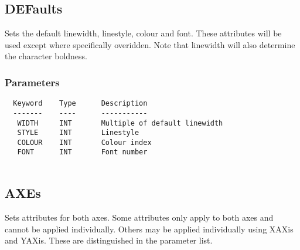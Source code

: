 \documentclass{book}
\renewcommand{\_}{{\tt\char'137}}     %
\begin{document}
\subsection{DEFaults}
Sets the default linewidth, linestyle, colour and font. These
attributes will be used except where specifically overidden. Note
that linewidth will also determine the character boldness.
 
\subsubsection{Parameters}
\begin{verbatim}
  Keyword    Type      Description
  -------    ----      -----------
   WIDTH     INT       Multiple of default linewidth
   STYLE     INT       Linestyle
   COLOUR    INT       Colour index
   FONT      INT       Font number
 
\end{verbatim}\subsection{AXEs}
Sets attributes for both axes. Some attributes only apply
to both axes and cannot be applied individually. Others may
be applied individually using XAXis and YAXis. These are
distinguished in the parameter list.
 
\end{document}
